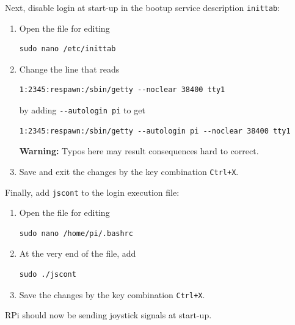 Next, disable login at start-up in the bootup service description
\texttt{inittab}:
\begin{enumerate}
	\item Open the file for editing \begin{verbatim}sudo nano /etc/inittab\end{verbatim}
	\item Change the line that reads \begin{verbatim}1:2345:respawn:/sbin/getty --noclear 38400 tty1\end{verbatim}
	by adding \texttt{-{}-autologin pi} to get \begin{verbatim}1:2345:respawn:/sbin/getty --autologin pi --noclear 38400 tty1\end{verbatim}
	\textbf{Warning:} Typos here may result consequences hard to correct.
	\item Save and exit the changes by the key combination \texttt{Ctrl+X}.
\end{enumerate}
Finally, add \texttt{jscont} to the login execution file:
\begin{enumerate}
	\item Open the file for editing \begin{verbatim}sudo nano /home/pi/.bashrc\end{verbatim}
	\item At the very end of the file, add \begin{verbatim}sudo ./jscont\end{verbatim}
	\item Save the changes by the key combination \texttt{Ctrl+X}.
\end{enumerate}
RPi should now be sending joystick signals at start-up.